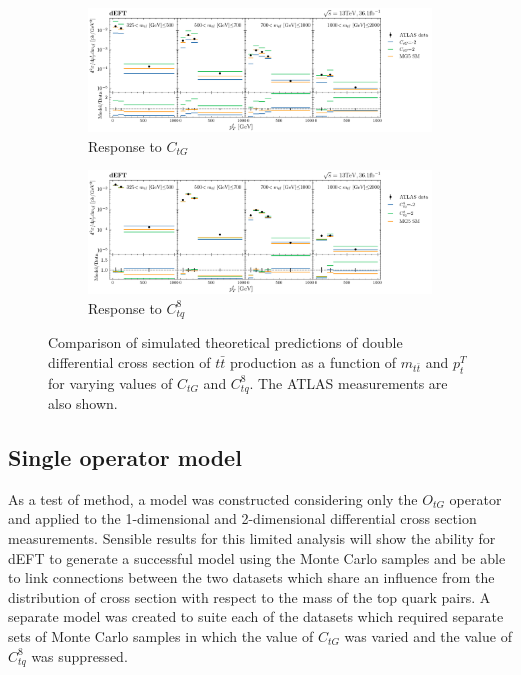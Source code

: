 \documentclass[a4paper,11pt]{article}
\begin{document}
\begin{figure}[H]
    \centering
    \begin{subfigure}[b]{\textwidth}
        \centering
        \includegraphics[width=\textwidth]{plots/data_plot_ctg.png}
        \caption{Response to $C_{tG}$}
    \end{subfigure}

    \begin{subfigure}[b]{\textwidth}
        \centering
        \includegraphics[width=\textwidth]{plots/data_plot_ctq.png}
        \caption{Response to $C_{tq}^{8}$}
    \end{subfigure}
    \caption{Comparison of simulated theoretical predictions of double differential cross section of $t\bar{t}$ production as a function of $m_{t\bar{t}}$ and $p_{t}^{T}$ for varying values of $C_{tG}$ and $C_{tq}^{8}$. The ATLAS measurements are also shown.}
    \label{fig:comparison}
\end{figure}

\subsection{Single operator model}

As a test of method, a model was constructed considering only the $O_{tG}$ operator and applied to the 1-dimensional and 2-dimensional differential cross section measurements.
Sensible results for this limited analysis will show the ability for dEFT to generate a successful model using the Monte Carlo samples and be able to link connections between the two datasets which share an influence from the distribution of cross section with respect to the mass of the top quark pairs.
A separate model was created to suite each of the datasets which required separate sets of Monte Carlo samples in which the value of $C_{tG}$ was varied and the value of $C_{tq}^{8}$ was suppressed.
\end{document}
